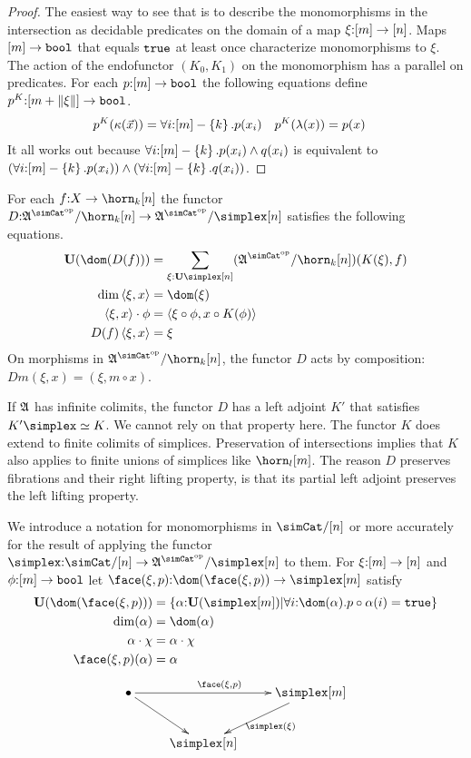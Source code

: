 \documentclass[csh.tex]{subfiles}
\begin{document}
\begin{proof} The easiest way to see that is to describe the monomorphisms in the intersection as decidable predicates on the domain of a map $\xi\mathord :[m]\to[n]$. Maps $[m]\to\mathtt{bool}$ that equals $\mathtt{true}$ at least once characterize monomorphisms to $\xi$. The action of the endofunctor $(K_0,K_1)$ on the monomorphism has a parallel on predicates. For each $p\mathord :[m]\to\mathtt{bool}$ the following equations define $p^K\mathord : [m+\Vert \xi \Vert]\to\mathtt{bool}$. 
\begin{align*}
p^K(\kappa(\vec x)) &= \forall i\mathord :[m]-\left\{k\right\}.p(x_i) &
p^K(\lambda(x)) &= p(x)
\end{align*}
It all works out because $\forall i\mathord :[m]-\left\{k\right\}.p(x_i)\land q(x_i)$ is equivalent to $(\forall i\mathord :[m]-\left\{k\right\}.p(x_i))\land(\forall i\mathord :[m]-\left\{k\right\}.q(x_i))$.
\end{proof}

\begin{definition}
For each $f\of X\to\horn_k[n]$ the functor $D\of \ambient\s/\horn_k[n]\to\ambient\s/\simplex[n]$ satisfies the following equations.
\begin{align*}
\base(\dom(D(f))) &= \sum_{\xi\of\base\simplex[n]}(\ambient\s/\horn_k[n])(K(\xi),f)\\
\dim\tuplet{\xi,x} &= \dom(\xi)\\
\tuplet{\xi,x}\cdot\phi &= \tuplet{\xi\circ\phi,x\circ K(\phi)}\\
D(f)\tuplet{\xi,x} &= \xi
\end{align*}
On morphisms in $\ambient\s/\horn_k[n]$, the functor $D$ acts by composition: $Dm(\xi,x) = (\xi,m\circ x)$. \label{descent functor}
\end{definition}

If $\mathfrak A$ has infinite colimits, the functor $D$ has a left adjoint $K'$ that satisfies $K'\simplex\simeq K$. We cannot rely on that property here. The functor $K$ does extend to finite colimits of simplices. Preservation of intersections implies that $K$ also applies to finite unions of simplices like $\horn_l[m]$. The reason $D$ preserves fibrations and their right lifting property, is that its partial left adjoint preserves the left lifting property. 

\begin{definition} We introduce a notation for monomorphisms in $\simCat/[n]$ or more accurately for the result of applying the functor $\simplex\of \simCat/[n] \to \ambient\s/\simplex[n]$ to them. For $\xi\mathord :[m]\to[n]$ and $\phi\mathord :[m]\to\mathtt{bool}$ let $\face(\xi,p)\of \dom(\face(\xi,p))\to \simplex[m]$ satisfy
\begin{align*}
\base(\dom(\face(\xi,p))) &= \set{\alpha\of\base(\simplex[m])\middle|\forall i\of \dom(\alpha).p\circ\alpha(i)=\true}\\
\dim(\alpha) &= \dom(\alpha)\\
\alpha\cdot\chi &= \alpha\cdot\chi\\
\face(\xi,p)(\alpha) &= \alpha
\end{align*}
\[\xymatrix{
\bullet\ar[rr]^{\face(\xi,p)}\ar[dr] && \simplex[m]\ar[dl]^{\simplex(\xi)} \\
& \simplex[n]
}\]
\end{definition}
\end{document}
